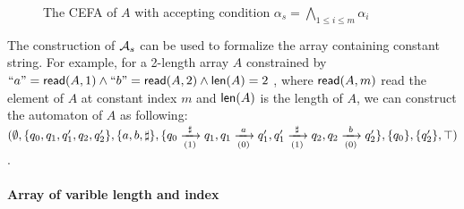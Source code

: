 {\begin{figure}[H]
\begin{tikzpicture}[initial text =, initial distance=3ex,
			node distance=1.2cm, auto,
			state/.style={circle, draw, inner sep=0pt, minimum size=5mm},
			accepting by double]
		\end{tikzpicture}
		\caption{The CEFA of $A$ with accepting condition $\alpha_s = \bigwedge\limits_{1\leq i \leq m} \alpha_i$}
		\label{fig:fixed_len_cons_idx}
	\end{figure}
	The construction of $\mathcal{A}_s$ can be used to formalize the array containing constant string. For example, for a 2-length array $A$ constrained by $``a" = \mathsf{read}(A, 1)\wedge ``b" = \mathsf{read}(A, 2) \wedge \mathsf{len}(A) = 2$ , where $\mathsf{read}(A, m)$ read the  element of $A$ at constant index $m$ and $\mathsf{len}(A)$ is the length of $A$, we can construct the automaton of $A$ as following: \\
	$(\emptyset, \{q_0,q_1,q_1',q_2,q_2'\}, \{a,b,\sharp\}, \{q_0\xrightarrow[(1)]{\sharp}q_1, q_1\xrightarrow[(0)]{a}q_1', q_1'\xrightarrow[(1)]{\sharp}q_2, q_2\xrightarrow[(0)]{b}q_2'\}, \{q_0\}, \{q_2'\}, \top)$. 
	\paragraph{Array of varible length and index} 
}%



